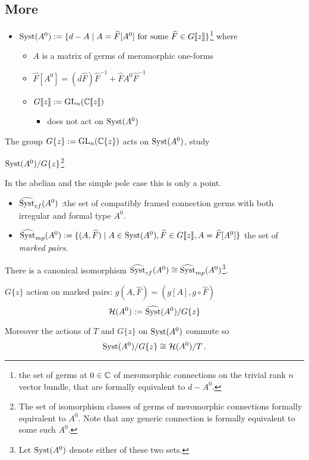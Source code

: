 \subsection{More}
\begin{defn}
  \begin{itemize}
    \item $\operatorname{Syst}(A^0):=\{d-A \mid A=\widehat{F}[A^0] \text{ for some } \widehat{F}\in
      G\llbracket z\rrbracket\}$\footnote{the set of germs at $0\in\mathbb{C}$ of
      meromorphic connections on the trivial rank $n$ vector bundle, that are
      formally equivalent to $d-A^0$.}
      where
      \begin{itemize}
        \item $A$ is a matrix of germs of meromorphic one-forms
        \item $\hat{F}[A^0]=(d\hat{F})\hat{F}^{-1}+\hat{F}A^0\hat{F}^{-1}$
        \item $G\llbracket z\rrbracket:=\operatorname{GL}_n(\mathbb{C}\llbracket z\rrbracket)$
          \begin{itemize}
            \item does not act on $\operatorname{Syst}(A^0)$
          \end{itemize}
      \end{itemize}
  \end{itemize}
  The group $G\{z\}:=\operatorname{GL}_n(\mathbb{C}\{z\})$ acts on $\operatorname{Syst}(A^0)$,  study
  \begin{center}
    $\operatorname{Syst}(A^0)/G\{z\}$\footnote{The set of isomorphism classes of germs of
    meromorphic connections formally equivalent to $A^0$. Note that any
    generic connection is formally equivalent to some such $A^0$.}
  \end{center}
  In the abelian and the simple pole case this is only a point.
\end{defn}
\begin{defn}
  \begin{itemize}
    \item $\widehat{\operatorname{Syst}}_{cf}(A^0)$ :\Leftrightarrow the set of compatibly
      framed connection germs with both irregular and formal type $A^0$.
    \item $\widehat{\operatorname{Syst}}_{mp}(A^0):=\{(A,\widehat{F})\mid A\in\operatorname{Syst}(A^0)
      ,\widehat{F}\in G\llbracket z\rrbracket
      ,A=\widehat{F}[A^0]\}$
      the set of \emph{marked pairs}.
  \end{itemize}
  There is a canonical isomorphism
  $\widehat{\operatorname{Syst}}_{cf}(A^0)\cong\widehat{\operatorname{Syst}}_{mp}(A^0)$\footnote{Let
  $\operatorname{Syst}(A^0)$ denote either of these two sets.}.

  $G\{z\}$ action on marked pairs: $g(A,\hat{F})=(g[A],g\circ\hat{F})$
  \[
    \mathcal{H}(A^0):=\widehat{\operatorname{Syst}}(A^0)/G\{z\}
  \]
\end{defn}
Moreover the actions of $T$ and $G\{z\}$ on $\operatorname{Syst}(A^0)$ commute so
\[
  \operatorname{Syst}(A^0)/G\{z\}\cong\mathcal{H}(A^0)/T \,.
\]

